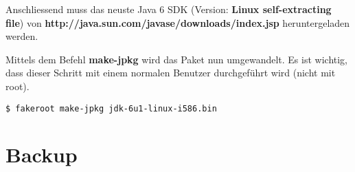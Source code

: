 \documentclass[a4paper,12pt,halfparskip,DIV14]{scrreprt}
\begin{document}
Anschliessend muss das neuste Java 6 SDK (Version: \textbf{Linux self-extracting file}) von \textbf{http://java.sun.com/javase/downloads/index.jsp} heruntergeladen werden.


Mittels dem Befehl \textbf{make-jpkg} wird das Paket nun umgewandelt. Es ist wichtig, dass dieser Schritt mit einem normalen Benutzer durchgeführt wird (nicht mit root).

\begin{verbatim}
$ fakeroot make-jpkg jdk-6u1-linux-i586.bin 
\end{verbatim}



\chapter{Backup} %
\label{cha:backup}

\end{document}
